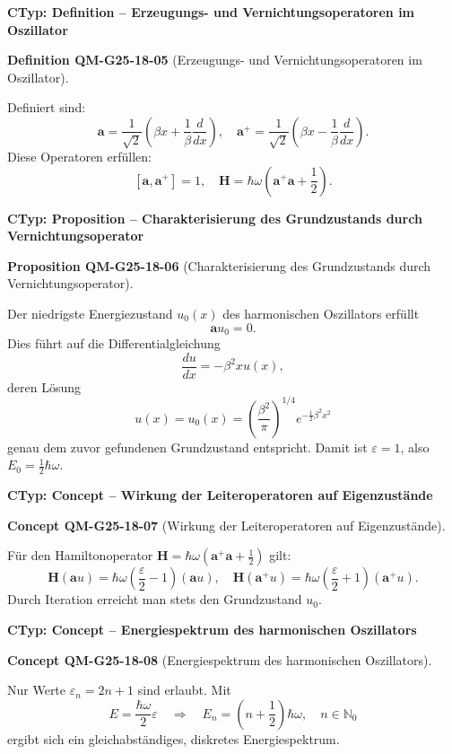 \documentclass[10pt, letterpaper]{article}
\newcommand{\CustomHeading}[3]{%
  \par\medskip\noindent%
  \textbf{#1 #2} \textnormal{(#3)}.\enskip%
}
\newenvironment{DEF}[2]{\begin{unitbox}\CustomHeading{Definition}{#1}{#2}}{\end{unitbox}}
\newenvironment{PROP}[2]{\begin{unitbox}\CustomHeading{Proposition}{#1}{#2}}{\end{unitbox}}
\newenvironment{CONC}[2]{\begin{unitbox}\CustomHeading{Concept}{#1}{#2}}{\end{unitbox}}
\begin{document}
\textbf{CTyp: Definition – Erzeugungs- und Vernichtungsoperatoren im Oszillator}

\begin{DEF}{QM-G25-18-05}{Erzeugungs- und Vernichtungsoperatoren im Oszillator}
Definiert sind:
\[
\mathbf{a} = \frac{1}{\sqrt{2}} \left( \beta x + \frac{1}{\beta} \frac{d}{dx} \right), \quad
\mathbf{a}^+ = \frac{1}{\sqrt{2}} \left( \beta x - \frac{1}{\beta} \frac{d}{dx} \right).
\]
Diese Operatoren erfüllen:
\[
[\mathbf{a}, \mathbf{a}^+] = 1, \quad \mathbf{H} = \hbar\omega\left( \mathbf{a}^+ \mathbf{a} + \frac{1}{2} \right).
\]
\end{DEF}


\textbf{CTyp: Proposition – Charakterisierung des Grundzustands durch Vernichtungsoperator}

\begin{PROP}{QM-G25-18-06}{Charakterisierung des Grundzustands durch Vernichtungsoperator}
Der niedrigste Energiezustand $u_0(x)$ des harmonischen Oszillators erfüllt
\[
\mathbf{a} u_0 = 0.
\]
Dies führt auf die Differentialgleichung
\[
\frac{du}{dx} = -\beta^2 x u(x),
\]
deren Lösung
\[
u(x) = u_0(x) = \left(\frac{\beta^2}{\pi}\right)^{1/4} e^{-\frac{1}{2} \beta^2 x^2}
\]
genau dem zuvor gefundenen Grundzustand entspricht. Damit ist $\varepsilon = 1$, also $E_0 = \frac{1}{2} \hbar \omega$.
\end{PROP}


\textbf{CTyp: Concept – Wirkung der Leiteroperatoren auf Eigenzustände}

\begin{CONC}{QM-G25-18-07}{Wirkung der Leiteroperatoren auf Eigenzustände}
Für den Hamiltonoperator $\mathbf{H} = \hbar\omega(\mathbf{a}^+ \mathbf{a} + \frac{1}{2})$ gilt:
\[
\mathbf{H}(\mathbf{a} u) = \hbar\omega \left( \frac{\varepsilon}{2} - 1 \right) (\mathbf{a} u), \quad
\mathbf{H}(\mathbf{a}^+ u) = \hbar\omega \left( \frac{\varepsilon}{2} + 1 \right) (\mathbf{a}^+ u).
\]
Durch Iteration erreicht man stets den Grundzustand $u_0$.
\end{CONC}



\textbf{CTyp: Concept – Energiespektrum des harmonischen Oszillators}

\begin{CONC}{QM-G25-18-08}{Energiespektrum des harmonischen Oszillators}
Nur Werte $\varepsilon_n = 2n + 1$ sind erlaubt. Mit
\[
E = \frac{\hbar\omega}{2} \varepsilon \quad \Rightarrow \quad
E_n = \left( n + \frac{1}{2} \right) \hbar \omega, \quad n \in \mathbb{N}_0
\]
ergibt sich ein gleichabständiges, diskretes Energiespektrum.
\end{CONC}
\end{document}
